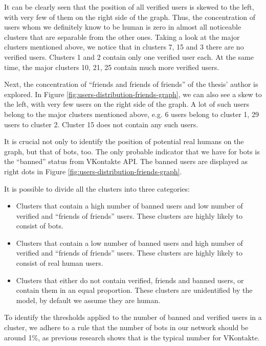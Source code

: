 It can be clearly seen that the position of all verified users is skewed to the left, with very few of them on the right side of the graph. Thus, the concentration of users whom we definitely know to be human is zero in almost all noticeable clusters that are separable from the other ones. Taking a look at the major clusters mentioned above, we notice that in clusters 7, 15 and 3 there are no verified users. Clusters 1 and 2 contain only one verified user each. At the same time, the major clusters 10, 21, 25 contain much more verified users.

Next, the concentration of ``friends and friends of friends'' of the thesis’ author is explored. In Figure \ref{fig:users-distribution-friends-graph}, we can also see a skew to the left, with very few users on the right side of the graph. A lot of such users belong to the major clusters mentioned above, e.g. 6 users belong to cluster 1, 29 users to cluster 2. Cluster 15 does not contain any such users.

It is crucial not only to identify the position of potential real humans on the graph, but that of bots, too. The only probable indicator that we have for bots is the ``banned'' status from VKontakte API. The banned users are displayed as right dots in Figure \ref{fig:users-distribution-friends-graph}.

It is possible to divide all the clusters into three categories:
\begin{itemize}
    \item Clusters that contain a high number of banned users and low number of verified and ``friends of friends'' users. These clusters are highly likely to consist of bots.
    \item Clusters that contain a low number of banned users and high number of verified and ``friends of friends'' users. These clusters are highly likely to consist of real human users.
    \item Clusters that either do not contain verified, friends and banned users, or contain them in an equal proportion. These clusters are unidentified by the model, by default we assume they are human.
\end{itemize}

To identify the thresholds applied to the number of banned and verified users in a cluster, we adhere to a rule that the number of bots in our network should be around 1\%, as previous research shows that is the typical number for VKontakte\cite{vkBotPercentage}.

